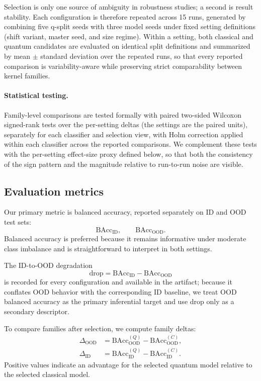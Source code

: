 \documentclass[journal]{IEEEtran}
\begin{document}
Selection is only one source of ambiguity in robustness studies; a second is result stability. Each configuration is therefore repeated across 15 runs, generated by combining five q-split seeds with three model seeds under fixed setting definitions (shift variant, master seed, and size regime). Within a setting, both classical and quantum candidates are evaluated on identical split definitions and summarized by mean $\pm$ standard deviation over the repeated runs, so that every reported comparison is variability-aware while preserving strict comparability between kernel families.

\paragraph{Statistical testing.}
Family-level comparisons are tested formally with paired two-sided Wilcoxon signed-rank tests over the per-setting deltas (the settings are the paired units), separately for each classifier and selection view, with Holm correction applied within each classifier across the reported comparisons. We complement these tests with the per-setting effect-size proxy defined below, so that both the consistency of the sign pattern and the magnitude relative to run-to-run noise are visible.

\subsection{Evaluation metrics}

Our primary metric is balanced accuracy, reported separately on ID and OOD test sets:
\[
\mathrm{BAcc}_{\mathrm{ID}}, \qquad \mathrm{BAcc}_{\mathrm{OOD}}.
\]
Balanced accuracy is preferred because it remains informative under moderate class imbalance and is straightforward to interpret in both settings.

The ID-to-OOD degradation
\[
\mathrm{drop} = \mathrm{BAcc}_{\mathrm{ID}} - \mathrm{BAcc}_{\mathrm{OOD}}
\]
is recorded for every configuration and available in the artifact; because it conflates OOD behavior with the corresponding ID baseline, we treat OOD balanced accuracy as the primary inferential target and use drop only as a secondary descriptor.

To compare families after selection, we compute family deltas:
\begin{align}
\Delta_{\mathrm{OOD}} &= \mathrm{BAcc}^{(Q)}_{\mathrm{OOD}} - \mathrm{BAcc}^{(C)}_{\mathrm{OOD}},\\
\Delta_{\mathrm{ID}}  &= \mathrm{BAcc}^{(Q)}_{\mathrm{ID}}  - \mathrm{BAcc}^{(C)}_{\mathrm{ID}}.
\end{align}
Positive values indicate an advantage for the selected quantum model relative to the selected classical model.
\end{document}
